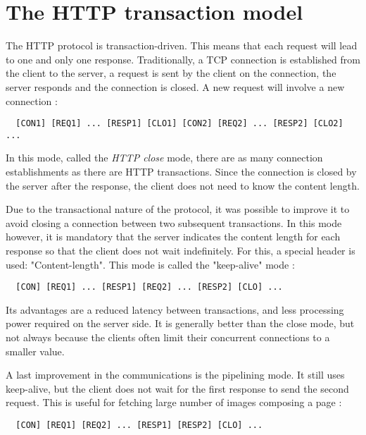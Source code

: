 
\section{The HTTP transaction model}

The HTTP protocol is transaction-driven. This means that each request will lead
to one and only one response. Traditionally, a TCP connection is established
from the client to the server, a request is sent by the client on the
connection, the server responds and the connection is closed. A new request
will involve a new connection :

\begin{verbatim}
  [CON1] [REQ1] ... [RESP1] [CLO1] [CON2] [REQ2] ... [RESP2] [CLO2] ...
\end{verbatim}


In this mode, called the \emph{HTTP close} mode, there are as many connection
establishments as there are HTTP transactions. Since the connection is closed
by the server after the response, the client does not need to know the content
length.


Due to the transactional nature of the protocol, it was possible to improve it
to avoid closing a connection between two subsequent transactions. In this mode
however, it is mandatory that the server indicates the content length for each
response so that the client does not wait indefinitely. For this, a special
header is used: "Content-length". This mode is called the "keep-alive" mode :

\begin{verbatim}
  [CON] [REQ1] ... [RESP1] [REQ2] ... [RESP2] [CLO] ...
\end{verbatim}


Its advantages are a reduced latency between transactions, and less processing
power required on the server side. It is generally better than the close mode,
but not always because the clients often limit their concurrent connections to
a smaller value.


A last improvement in the communications is the pipelining mode. It still uses
keep-alive, but the client does not wait for the first response to send the
second request. This is useful for fetching large number of images composing a
page :

\begin{verbatim}
  [CON] [REQ1] [REQ2] ... [RESP1] [RESP2] [CLO] ...
\end{verbatim}



